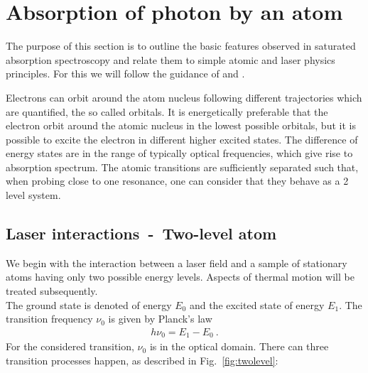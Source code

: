 
\ifpdf{}
\graphicspath{{Chapter2/Figs/Raster/}{Chapter2/Figs/PDF/}{Chapter2/Figs/}}
\else
\graphicspath{{Chapter2/Figs/Vector/}{Chapter2/Figs/}}
\fi

\chapter{Absorption of photon by an atom}  %
The purpose of this section is to outline the basic features observed in 
saturated absorption spectroscopy and relate them to simple atomic and laser 
physics principles. For this we will follow the guidance of \citep{SAS} and 
\citep{SAS_appendix}.

Electrons can orbit around the atom nucleus following different trajectories which
are quantified, the so called orbitals. It is energetically preferable that the
electron orbit around the atomic nucleus in the lowest possible orbitals, but it 
is possible to excite the electron in different higher excited states. The 
difference of energy states are in the range of typically optical frequencies, 
which give rise to absorption spectrum. The atomic transitions are sufficiently 
separated such that, when probing close to one resonance, one can consider that 
they behave as a 2 level system.

\section{Laser interactions~-~Two-level atom} %

We begin with the interaction between a laser field and a sample of stationary 
atoms having only two possible energy levels. Aspects of thermal motion will 
be treated subsequently.\\ 
The ground state is denoted  of energy \(E_0 \) and the excited state 
 of energy \(E_1 \). The transition frequency \(\nu_0 \) is given by 
Planck's law
\begin{align}
    h \nu_0 = E_1 - E_0~.
\end{align}
For the considered transition, \(\nu_0 \) is in the optical domain.
There can three transition processes happen, as described in Fig.~\ref{fig:twolevel}:
\pagebreak

